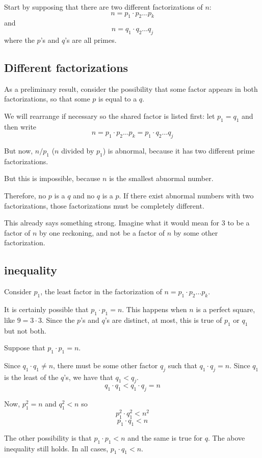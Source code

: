 \documentclass[11pt, oneside]{article}
\begin{document}
Start by supposing that there are two different factorizations of $n$:
\[ n = p_1 \cdot p_2 \dots p_k \]
and
\[ n = q_1 \cdot q_2 \dots q_j \]
where the $p$'s and $q$'s are all primes.

\subsection*{Different factorizations}

As a preliminary result, consider the possibility that some factor appears in both factorizations, so that some $p$ is equal to a $q$.

We will rearrange if necessary so the shared factor is listed first:  let $p_1 = q_1$ and then write
\[ n = p_1 \cdot p_2 \dots p_k = p_1 \cdot q_2 \dots q_j \]

But now, $n/p_1$ ($n$ divided by $p_1$) is abnormal, because it has two different prime factorizations.  

But this is impossible, because $n$ is the smallest abnormal number.

Therefore, no $p$ is a $q$ and no $q$ is a $p$.  If there exist abnormal numbers with two factorizations, those factorizations must be completely different.

This already says something strong.  Imagine what it would mean for $3$ to be a factor of $n$ by one reckoning, and not be a factor of $n$ by some other factorization.

\subsection*{inequality}

Consider $p_1$, the least factor in the factorization of $n = p_1 \cdot p_2 \dots p_k$.  

It is certainly possible that $p_1 \cdot p_1 = n$.  This happens when $n$ is a perfect square, like $9 = 3 \cdot 3$.  Since the $p$'s and $q$'s are distinct, at most, this is true of $p_1$ or $q_1$ but not both.  

Suppose that $p_1 \cdot p_1 = n$.

Since $q_1 \cdot q_1 \ne n$, there must be some other factor $q_j$ such that $q_1 \cdot q_j = n$.  Since $q_1$ is the least of the $q$'s, we have that $q_1 < q_j$.  
\[ q_1 \cdot q_1 < q_1 \cdot q_j = n \]

Now, $p_1^2 = n$ and $q_1^2 < n$ so
\[ p_1^2 \cdot q_1^2 < n^2 \]
\[ p_1 \cdot q_1 < n \]

The other possibility is that $p_1 \cdot p_1 < n$ and the same is true for $q$.  The above inequality still holds.  In all cases, $p_1 \cdot q_1 < n$.
\end{document}

